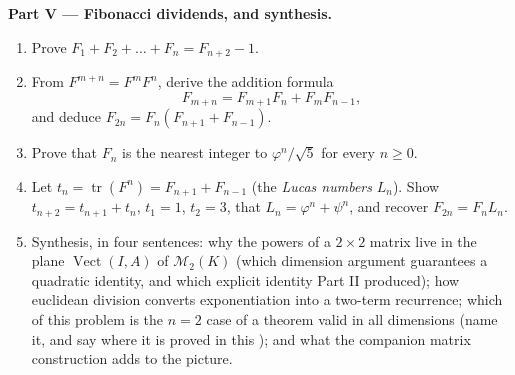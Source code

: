 \begin{problem}
\medskip
\noindent\textbf{Part V --- Fibonacci dividends, and synthesis.}
\begin{enumerate}[resume]
  \item Prove $F_1 + F_2 + \dots + F_n = F_{n+2} - 1$.
  \item From $F^{m+n} = F^m F^n$, derive the addition formula
        \[
        F_{m+n} = F_{m+1}F_n + F_m F_{n-1},
        \]
        and deduce $F_{2n} = F_n(F_{n+1} + F_{n-1})$.
  \item Prove that $F_n$ is the nearest integer to
        $\varphi^n/\sqrt5$ for every $n \geq 0$.
  \item Let $t_n = \operatorname{tr}(F^n) = F_{n+1} + F_{n-1}$
        (the \emph{Lucas numbers} $L_n$). Show $t_{n+2} =
        t_{n+1} + t_n$, $t_1 = 1$, $t_2 = 3$, that $L_n =
        \varphi^n + \psi^n$, and recover $F_{2n} = F_n L_n$.
  \item Synthesis, in four sentences: why the powers of a $2
        \times 2$ matrix live in the plane
        $\operatorname{Vect}(I, A)$ of $\mathcal{M}_2(K)$ (which
        dimension argument guarantees a quadratic identity, and
        which explicit identity Part II produced); how euclidean
        division converts exponentiation into a two-term
        recurrence; which  of this problem is the $n =
        2$ case of a theorem valid in all dimensions (name it,
        and say where it is proved in this ); and what the
        companion matrix construction adds to the picture.
\end{enumerate}
\end{problem}
